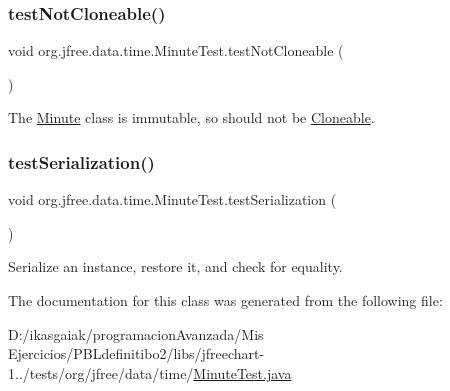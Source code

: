 \subsubsection{\texorpdfstring{test\+Not\+Cloneable()}{testNotCloneable()}}
{\footnotesize\ttfamily void org.\+jfree.\+data.\+time.\+Minute\+Test.\+test\+Not\+Cloneable (\begin{DoxyParamCaption}{ }\end{DoxyParamCaption})}

The \mbox{\hyperlink{classorg_1_1jfree_1_1data_1_1time_1_1_minute}{Minute}} class is immutable, so should not be \mbox{\hyperlink{}{Cloneable}}. \mbox{\label{classorg_1_1jfree_1_1data_1_1time_1_1_minute_test_a70d88c262e4dbe2553cf1f3c6e9e61c8}} 
\subsubsection{\texorpdfstring{test\+Serialization()}{testSerialization()}}
{\footnotesize\ttfamily void org.\+jfree.\+data.\+time.\+Minute\+Test.\+test\+Serialization (\begin{DoxyParamCaption}{ }\end{DoxyParamCaption})}

Serialize an instance, restore it, and check for equality. 

The documentation for this class was generated from the following file\+:\begin{DoxyCompactItemize}
\item 
D\+:/ikasgaiak/programacion\+Avanzada/\+Mis Ejercicios/\+P\+B\+Ldefinitibo2/libs/jfreechart-\/1../tests/org/jfree/data/time/\mbox{\hyperlink{_minute_test_8java}{Minute\+Test.\+java}}\end{DoxyCompactItemize}
